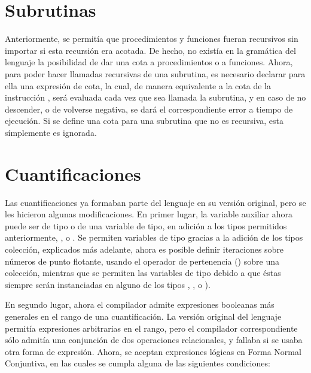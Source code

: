 \section{Subrutinas}

Anteriormente, se permitía que procedimientos y funciones fueran recursivos sin
importar si esta recursión era acotada. De hecho, no existía en la gramática del
lenguaje la posibilidad de dar una cota a procedimientos o a funciones. Ahora,
para poder hacer llamadas recursivas de una subrutina, es necesario declarar
para ella una expresión de cota, la cual, de manera equivalente a la cota de la
instrucción , será evaluada cada vez que sea llamada la subrutina, y
en caso de no descender, o de volverse negativa, se dará el correspondiente
error a tiempo de ejecución. Si se define una cota para una subrutina que no es
recursiva, esta símplemente es ignorada.

\section{Cuantificaciones}

Las cuantificaciones ya formaban parte del lenguaje en su versión original, pero
se les hicieron algunas modificaciones. En primer lugar, la variable auxiliar
ahora puede ser de tipo  o de una variable de tipo, en adición a
los tipos permitidos anteriormente,  ,  o
. Se permiten variables de tipo  gracias a la
adición de los tipos colección, explicados más adelante, ahora es posible
definir iteraciones sobre números de punto flotante, usando el operador de
pertenencia (\Elem) sobre una colección, mientras que se permiten las variables
de tipo debido a que éstas siempre serán instanciadas en alguno de los
tipos , ,  o ).

En segundo lugar, ahora el compilador admite expresiones booleanas más generales
en el rango de una cuantificación. La versión original del lenguaje permitía
expresiones arbitrarias en el rango, pero el compilador correspondiente sólo
admitía una conjunción de dos operaciones relacionales, y fallaba si se usaba
otra forma de expresión. Ahora, se aceptan expresiones lógicas en Forma Normal
Conjuntiva, en las cuales se cumpla alguna de las siguientes condiciones:

